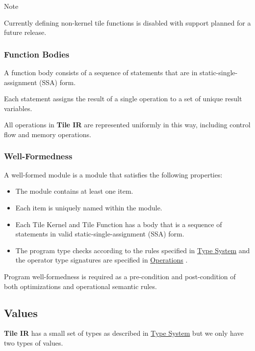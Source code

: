 \documentclass{article}
\begin{document}
Note


Currently defining non-kernel tile functions is disabled with support planned for a future release.



\subsubsection{Function Bodies}

A function body consists of a sequence of statements that are in static-single-assignment (SSA) form.


Each statement assigns the result of a single operation to a set of unique result variables.

All operations in \textbf{Tile IR} are represented uniformly in this way, including control flow and memory operations.



\subsubsection{Well-Formedness}

A well-formed module is a module that satisfies the following properties:


\begin{itemize}
\item The module contains at least one item.
\item Each item is uniquely named within the module.
\item Each Tile Kernel and Tile Function has a body that is a sequence of statements in valid static-single-assignment (SSA) form.
\item The program type checks according to the rules specified in \href{https://docs.nvidia.com/cuda/tile-ir/latest/sections/types.html#section-types}{Type System} and the operator type signatures are specified in \href{https://docs.nvidia.com/cuda/tile-ir/latest/sections/operations.html#section-operations}{Operations} .

\end{itemize}
Program well-formedness is required as a pre-condition and post-condition of both optimizations and operational semantic rules.



\subsection{Values}

\textbf{Tile IR} has a small set of types as described in \href{https://docs.nvidia.com/cuda/tile-ir/latest/sections/types.html#section-types}{Type System} but we only have two types of values.
\end{document}
